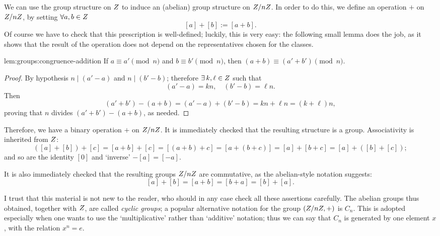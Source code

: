 We can use the group structure on $Z$ to induce an (abelian) group
structure on $Z/nZ$. In order to do this, we define an operation $+$
on $Z/nZ$, by setting $\forall a, b \in Z$
\[ [a] + [b] := [a + b].
\]
Of course we have to check that this prescription is well-defined;
luckily, this is very easy: the following small lemma does the job, as
it shows that the result of the operation does not depend on the
representatives chosen for the classes.
\begin{lem}{}{lem:groups:congruence-addition}
  If $a \equiv a' \pmod{n}$ and $b \equiv b' \pmod{n}$, then
  $(a+b) \equiv (a'+b') \pmod{n}$.
\end{lem}
\begin{proof}
  By hypothesis $n \mid (a'-a)$ and $n \mid (b'-b)$; therefore
  $\exists\, k, \ell \in Z$ such that
  \[
    (a'-a) = kn, \quad (b'-b) = \ell n.
  \]
  Then
  \[
    (a'+b') - (a+b) = (a'-a) + (b'-b) = kn + \ell n = (k+\ell)n,
  \]
  proving that $n$ divides $(a'+b') - (a+b)$, as needed.
\end{proof}
Therefore, we have a binary operation $+$ on $Z/nZ$. It is
immediately checked that the resulting structure is a
group. Associativity is inherited from $Z$:
\[
  ([a]+[b])+[c] = [a+b]+[c] = [(a+b)+c] = [a+(b+c)] = [a]+[b+c] =
  [a]+([b]+[c]);
\]
and so are the identity $[0]$ and `inverse' $-[a] = [-a]$.

It is also immediately checked that the resulting groups $Z/nZ$ are
commutative, as the abelian-style notation suggests:
\[ [a]+[b] = [a+b] = [b+a] = [b]+[a].
\]

I trust that this material is not new to the reader, who should in any
case check all these assertions carefully.  The abelian groups thus
obtained, together with $Z$, are called \textit{cyclic groups}; a
popular alternative notation for the group $(Z/nZ, +)$ is
$C_n$. This is adopted especially when one wants to use the
`multiplicative' rather than `additive' notation; thus we can say that
$C_n$ is generated by one element $x$, with the relation $x^n = e$.

